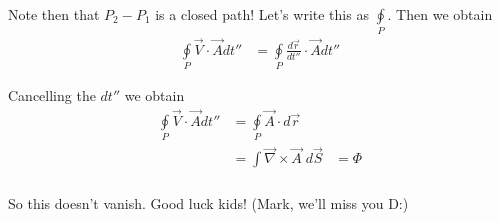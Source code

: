 \documentclass[10pt]{report}
\begin{document}
Note then that $P_2 - P_1$ is a closed path! Let's write this as $\oint\limits_P$. Then we obtain
\begin{align}
    \oint\limits_P \vec{V}\cdot \vec{A}dt'' &= \oint\limits_P \frac{d\vec{r}}{dt''}\cdot \vec{A}dt''
\end{align}

Cancelling the $dt''$ we obtain
\begin{align}
    \oint\limits_P \vec{V}\cdot \vec{A}dt'' &= \oint\limits_P \vec{A}\cdot d\vec{r}\\
    &= \displaystyle\int\limits_{}^{}\vec{\nabla}\times\vec{A}\;d\vec{S}
    &= \Phi
\end{align}

So this doesn't vanish. Good luck kids! (Mark, we'll miss you D:)
\end{document}

